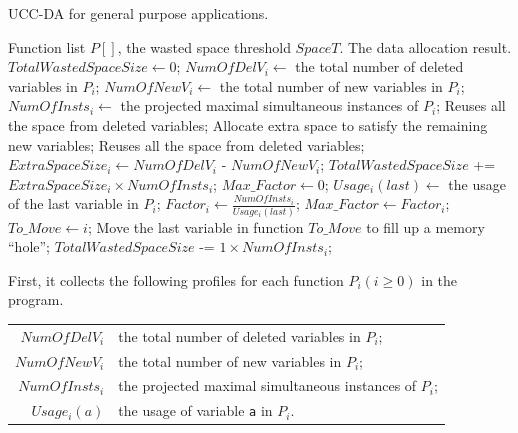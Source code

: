 \begin{algorithm}
\singlespace
\caption{UCC-DA for general purpose applications.}
\label{alg-data}
\begin{algorithmic}[1]
\singlespace
\REQUIRE Function list $P[]$, the wasted space threshold $SpaceT$.
\ENSURE The data allocation result.
\STATE $TotalWastedSpaceSize \leftarrow 0$;
\STATE $NumOfDelV_i \leftarrow $ the total number of deleted variables in $P_i$;
\STATE $NumOfNewV_i \leftarrow $ the total number of new variables in $P_i$; 
\STATE $NumOfInsts_i \leftarrow $ the projected maximal simultaneous instances of $P_i$;
\STATE Reuses all the space from deleted variables;
\STATE Allocate extra space to satisfy the remaining new variables;
\ELSE
\STATE Reuses all the space from deleted variables;
\STATE $ExtraSpaceSize_i \leftarrow NumOfDelV_i$ - $NumOfNewV_i$;
\STATE $TotalWastedSpaceSize$ += $ExtraSpaceSize_i \times NumOfInsts_i$;
\ENDIF
\ENDFOR
{}
\STATE $Max\_Factor \leftarrow 0$;
\STATE $Usage_i(last) \leftarrow$  the usage of the last variable in $P_i$;
\STATE $Factor_i \leftarrow \frac{NumOfInsts_i}{Usage_i(last)}$;
\STATE $Max\_Factor \leftarrow Factor_i$;
\STATE $To\_Move \leftarrow i$;
\ENDIF
\ENDFOR
\STATE Move the last variable in function $To\_Move$ to fill up a memory ``hole'';
\STATE $TotalWastedSpaceSize$ -= $1\times NumOfInsts_i$;
\ENDWHILE
\end{algorithmic}
\end{algorithm}
\vspace{0.2in}
First, it collects the following profiles for each function $P_i(i\geq
0)$ in the program. 
\vspace{+0.1in}
\begin{small}
\begin{center}
\begin{tabular}{r|l}
$NumOfDelV_i$ & the total number of deleted variables in $P_i$; \\
$NumOfNewV_i$ & the total number of new variables in $P_i$; \\
$NumOfInsts_i$ & the projected maximal simultaneous instances of $P_i$; \\
$Usage_i(a)$ & the usage of variable {\tt a} in $P_i$. 
\end{tabular}
\end{center}
\end{small}

